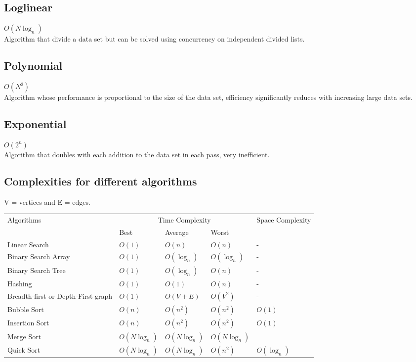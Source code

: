 \documentclass[a4paper,11pt]{article}
\begin{document}
\subsection{Loglinear}
$O(N\log_n)$\\
Algorithm that divide a data set but can be solved using concurrency on independent divided lists.
\subsection{Polynomial}
$O(N^2)$\\
Algorithm whose performance is proportional to the size of the data set, efficiency significantly reduces with increasing large data sets.
\subsection{Exponential}
$O(2^n)$\\
Algorithm that doubles with each addition to the data set in each pass, very inefficient.
\subsection{Complexities for different algorithms}
V = vertices and E = edges.
\begin{table}[H]
    \centering
    \begin{tabularx}{0.95\textwidth}{p{}|p{}p{}p{}p{}}
    \multirow{2}{*}{Algorithms} & \multicolumn{3}{c}{Time Complexity} & \multirow{2}{*}{Space Complexity} \\
     & Best & Average & Worst &  \\
     \hline
    Linear Search & $O(1)$ & $O(n)$ & $O(n)$ & - \\
    Binary Search Array & $O(1)$ & $O(\log_n)$ & $O(\log_n)$ & - \\
    Binary Search Tree & $O(1)$ & $O(\log_n)$ & $O(n)$ & - \\
    Hashing & $O(1)$ & $O(1)$ & $O(n)$ & - \\
    Breadth-first or Depth-First graph & $O(1)$ & $O(V+E)$ & $O(V^2)$ & - \\
    Bubble Sort & $O(n)$ & $O(n^2)$ & $O(n^2)$ & $O(1)$ \\
    Insertion Sort & $O(n)$ & $O(n^2)$ & $O(n^2)$ & $O(1)$ \\
    Merge Sort & $O(N \log_n)$ & $O(N \log_n)$ & $O(N \log_n)$ &  \\
    Quick Sort & $O(N \log_n)$ & $O(N \log_n)$ & $O(n^2)$ & $O(\log_n)$
    \end{tabularx}
    \end{table}
\end{document}
